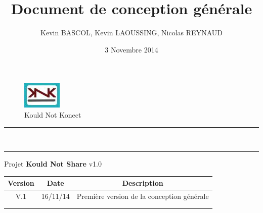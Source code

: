 \documentclass[10pt,a4paper]{report}
\author{Kevin BASCOL, Kevin LAOUSSING, Nicolas REYNAUD}
\title{Document de conception générale}
\date{3 Novembre 2014}
\begin{document}
\makeatletter
	\begin{titlepage}
	
	\begin{figure}
		\begin{minipage}[c]{.46\linewidth}
		\end{minipage} \hfill
		\begin{minipage}[c]{.20\linewidth}
			\begin{center}
				\includegraphics{../Logo/logoKNK.jpg}\\
				{\large Kould Not Konect}
			\end{center}
		\end{minipage}
	\vspace{1cm}
	\end{figure}
	
	\centering
		{
		\hrule height 2pt
		\vspace{0.7cm}
		\Huge \textbf{\@title}}\\
		\vspace{0.7cm}
		\hrule height 2pt
		\vspace{1.5cm}
		{\LARGE  Projet \textbf{Kould Not Share} v1.0}
		
		\vfill
		
		\begin{tabular}{|c|c|c|}
			\hline
			Version & Date & Description\\
			\hline
			V.1 & 16/11/14 & Première version de la conception générale\\
			\hline
			 & & \\
			\hline
			 & & \\
			\hline
		\end{tabular}\\
		\vspace{1cm}
		\@author\\
		\end{titlepage}
\makeatother
\setcounter{secnumdepth}{5}
\setcounter{tocdepth}{5}
\renewcommand{\contentsname}{Sommaire}
\begingroup\makeatletter
\def\@makeschapterhead#1{%
  {\parindent \z@ \raggedright
    \normalfont
    \interlinepenalty\@M
    \Huge \bfseries  #1\par\nobreak
    \vskip 20pt%
  }}\makeatother
\tableofcontents
\endgroup
\thispagestyle{empty}
\setcounter{page}{0}
\newpage
\end{document}
